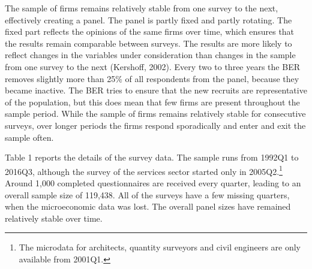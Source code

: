 \documentclass[11pt,]{article}
\let\rmarkdownfootnote\footnote%
\def\footnote{\protect\rmarkdownfootnote}
\begin{document}
The sample of firms remains relatively stable from one survey to the
next, effectively creating a panel. The panel is partly fixed and partly
rotating. The fixed part reflects the opinions of the same firms over
time, which ensures that the results remain comparable between surveys.
The results are more likely to reflect changes in the variables under
consideration than changes in the sample from one survey to the next
(Kershoff, 2002). Every two to three years the BER removes slightly more
than 25\% of all respondents from the panel, because they became
inactive. The BER tries to ensure that the new recruits are
representative of the population, but this does mean that few firms are
present throughout the sample period. While the sample of firms remains
relatively stable for consecutive surveys, over longer periods the firms
respond sporadically and enter and exit the sample often.

Table 1 reports the details of the survey data. The sample runs from
1992Q1 to 2016Q3, although the survey of the services sector started
only in 2005Q2.\footnote{The microdata for architects, quantity
  surveyors and civil engineers are only available from 2001Q1.} Around
1,000 completed questionnaires are received every quarter, leading to an
overall sample size of 119,438. All of the surveys have a few missing
quarters, when the microeconomic data was lost. The overall panel sizes
have remained relatively stable over time.

\begin{table}[ht]
\centering
\caption{Sample characteristics} 
\end{table}
\end{document}
